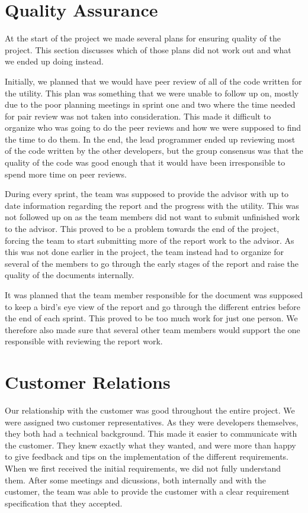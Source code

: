 \section{Quality Assurance}
At the start of the project we made several plans for ensuring quality of the project. This section discusses which of those plans did not work out and what we ended up doing instead.

Initially, we planned that we would have peer review of all of the code written for the utility. This plan was something that we were unable to follow up on, mostly due to the poor planning meetings in sprint one and two where the time needed for pair review was not taken into consideration. This made it difficult to organize who was going to do the peer reviews and how we were supposed to find the time to do them. In the end, the lead programmer ended up reviewing most of the code written by the other developers, but the group consensus was that the quality of the code was good enough that it would have been irresponsible to spend more time on peer reviews.

During every sprint, the team was supposed to provide the advisor with up to date information regarding the report and the progress with the utility. This was not followed up on as the team members did not want to submit unfinished work to the advisor. This proved to be a problem towards the end of the project, forcing the team to start submitting more of the report work to the advisor. As this was not done earlier in the project, the team instead had to organize for several of the members to go through the early stages of the report and raise the quality of the documents internally.

It was planned that the team member responsible for the document was supposed to keep a bird's eye view of the report and go through the different entries before the end of each sprint. This proved to be too much work for just one person. We therefore also made sure that several other team members would support the one responsible with reviewing the report work.

\section{Customer Relations}
Our relationship with the customer was good throughout the entire project.
We were assigned two customer representatives. As they were developers themselves, they both had a technical background. This made it easier to communicate with the customer.
They knew exactly what they wanted, and were more than happy to give feedback and tips on the implementation of the different requirements. When we first received the initial requirements, we did not fully understand them. After some meetings and dicussions, both internally and with the customer, the team was able to provide the customer with a clear requirement specification that they accepted.

